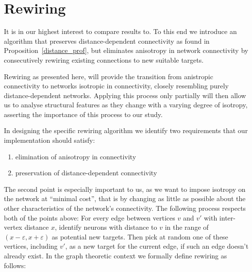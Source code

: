 




\section{Rewiring}\label{sec:rewiring}



It is in our highest interest to compare results to. 
To this end we introduce an algorithm that preserves
distance-dependent connectivity as found in
Proposition~\ref{distance_prof}, but eliminates anisotropy in network
connectivity by consecutively rewiring existing connections to new
suitable targets.


Rewiring as presented here, will provide the transition from
anistropic connectivity to networks isotropic in connectivity, closely
resembling purely distance-dependent networks. Applying this process
only partially will then allow us to analyse structural features as
they change with a varying degree of isotropy, asserting the
importance of this process to our study.

In designing the specific rewiring algorithm we identify two
requirements that our implementation should satisfy:
\vspace{-6pt}
\begin{enumerate}
  \itemsep-11pt
  \item elimination of anisotropy in connectivity 
  \item preservation of distance-dependent connectivity
\end{enumerate}
\vspace{-6pt}%
The second point is especially important to us, as we want to impose
isotropy on the network at \enquote{minimal cost}, that is by changing
as little as possible about the other characteristics of the network's
connectivity. The following process respects both of the points above:
For every edge between vertices $v$ and $v'$ with inter-vertex
distance $x$, identify neurons with distance to $v$ in the range of
$(x-\varepsilon, x+\varepsilon)$ as potential new targets. Then pick
at random one of these vertices, including $v'$, as a new target for
the current edge, if such an edge doesn't already exist. %
In the graph theoretic context we formally define rewiring as follows:

